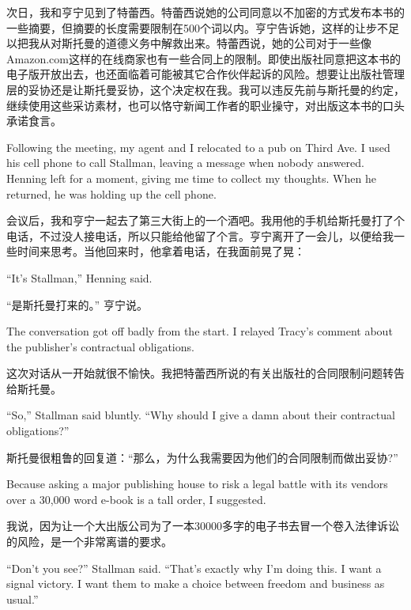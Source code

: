 \ifdefined\chs
次日，我和亨宁见到了特蕾西。特蕾西说她的公司同意以不加密的方式发布本书的一些摘要，但摘要的长度需要限制在500个词以内。亨宁告诉她，这样的让步不足以把我从对斯托曼的道德义务中解救出来。特蕾西说，她的公司对于一些像Amazon.com这样的在线商家也有一些合同上的限制。即使出版社同意把这本书的电子版开放出去，也还面临着可能被其它合作伙伴起诉的风险。想要让出版社管理层的妥协还是让斯托曼妥协，这个决定权在我。我可以违反先前与斯托曼的约定，继续使用这些采访素材，也可以恪守新闻工作者的职业操守，对出版这本书的口头承诺食言。
\fi

\ifdefined\eng
Following the meeting, my agent and I relocated to a pub on Third Ave. I used his cell phone to call Stallman, leaving a message when nobody answered. Henning left for a moment, giving me time to collect my thoughts. When he returned, he was holding up the cell phone.
\fi

\ifdefined\chs
会议后，我和亨宁一起去了第三大街上的一个酒吧。我用他的手机给斯托曼打了个电话，不过没人接电话，所以只能给他留了个言。亨宁离开了一会儿，以便给我一些时间来思考。当他回来时，他拿着电话，在我面前晃了晃：
\fi

\ifdefined\eng
``It's Stallman,'' Henning said.
\fi

\ifdefined\chs
``是斯托曼打来的。'' 亨宁说。
\fi

\ifdefined\eng
The conversation got off badly from the start. I relayed Tracy's comment about the publisher's contractual obligations.
\fi

\ifdefined\chs
这次对话从一开始就很不愉快。我把特蕾西所说的有关出版社的合同限制问题转告给斯托曼。
\fi

\ifdefined\eng
``So,'' Stallman said bluntly. ``Why should I give a damn about their contractual obligations?''
\fi

\ifdefined\chs
斯托曼很粗鲁的回复道：``那么，为什么我需要因为他们的合同限制而做出妥协?''
\fi

\ifdefined\eng
Because asking a major publishing house to risk a legal battle with its vendors over a 30,000 word e-book is a tall order, I suggested. %
\fi

\ifdefined\chs
我说，因为让一个大出版公司为了一本30000多字的电子书去冒一个卷入法律诉讼的风险，是一个非常离谱的要求。%
\fi

\ifdefined\eng
``Don't you see?'' Stallman said. ``That's exactly why I'm doing this. I want a signal victory. I want them to make a choice between freedom and business as usual.''
\fi

